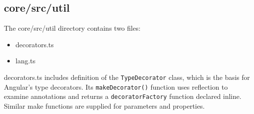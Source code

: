 \subsection{core/src/util}

The core/src/util directory contains two files:

\begin{itemize}
  \item decorators.ts
  \item lang.ts
\end{itemize}

decorators.ts includes definition of the
\texttt{TypeDecorator}
class, which is the basis for
Angular’s type decorators. Its
\texttt{makeDecorator()}
function uses reflection to examine
annotations and returns a
\texttt{decoratorFactory}
function declared inline. Similar make
functions are supplied for parameters and properties.

